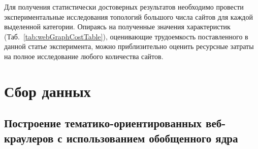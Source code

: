 Для получения статистически достоверных результатов необходимо провести экспериментальные исследования топологий большого числа сайтов для каждой выделенной категории. Опираясь на полученные значения характеристик (Таб.~\cref{tab:webGraphCostTable}), оценивающие трудоемкость поставленного в данной статье эксперимента, можно приблизительно оценить ресурсные затраты на полное исследование любого количества сайтов.

\section{Сбор данных}\label{sec:ch1/sec3}


\subsection{Построение тематико-ориентированных веб-краулеров с использованием обобщенного ядра}\label{subsec:ch1/sec3/sub1}

%
%
%
%
%

